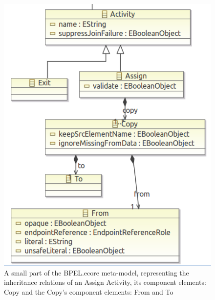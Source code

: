 \begin{figure}
  \begin{center}
    \includegraphics[scale=0.5]{pictures/BPELMetaModelExample.png}
    \caption{A small part of the BPEL.ecore meta-model, representing the inheritance relations of an Assign Activity, its component elements: Copy and the Copy's component elements: From and To}
    \label{BPELEcoreExample}
  \end{center}
\end{figure}



   

% 


